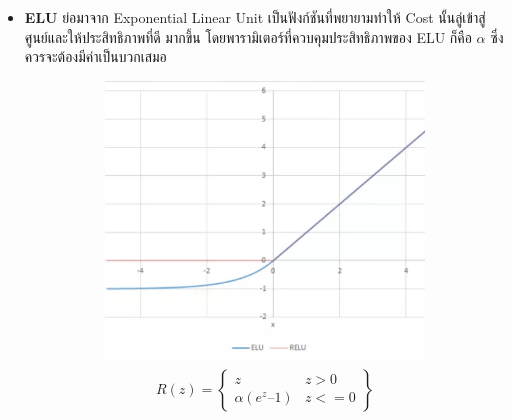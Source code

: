 \begin{itemize}
    \item \textbf{ELU} ย่อมาจาก Exponential Linear Unit เป็นฟังก์ชันที่พยายามทำให้ Cost นั้นลู่เข้าสู่ศูนย์และให้ประสิทธิภาพที่ดี%
    มากขึ้น โดยพารามิเตอร์ที่ควบคุมประสิทธิภาพของ ELU ก็คือ $\alpha$ ซึ่งควรจะต้องมีค่าเป็นบวกเสมอ
    \begin{figure}[H]
        \centering
        \begin{subfigure}{0.5\textwidth}
            \centering
            \includegraphics[width=0.9\linewidth]{fig/actfunc_elu.png}
            \caption{%
                \begin{equation}
                    \begin{split}R(z) = \begin{Bmatrix} z & z > 0 \\
                        \alpha (e^z – 1) & z <= 0 \end{Bmatrix}\end{split}
                \end{equation}
            }
            \label{fig:actfunc_elu}
        \end{subfigure}%
        \begin{subfigure}{0.5\textwidth}
            \centering

\end{subfigure}
\end{figure}
\end{itemize}
